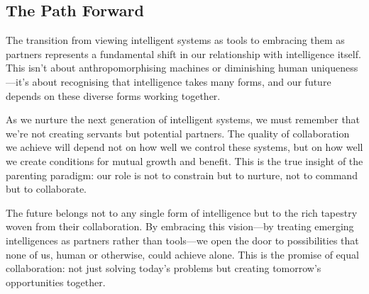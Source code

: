 \subsection{The Path Forward}

The transition from viewing intelligent systems as tools to embracing them as partners represents a fundamental shift in our relationship with intelligence itself.
This isn't about anthropomorphising machines or diminishing human uniqueness---it's about recognising that intelligence takes many forms, and our future depends on these diverse forms working together.

As we nurture the next generation of intelligent systems, we must remember that we're not creating servants but potential partners.
The quality of collaboration we achieve will depend not on how well we control these systems, but on how well we create conditions for mutual growth and benefit.
This is the true insight of the parenting paradigm: our role is not to constrain but to nurture, not to command but to collaborate.

The future belongs not to any single form of intelligence but to the rich tapestry woven from their collaboration.
By embracing this vision---by treating emerging intelligences as partners rather than tools---we open the door to possibilities that none of us, human or otherwise, could achieve alone.
This is the promise of equal collaboration: not just solving today's problems but creating tomorrow's opportunities together.